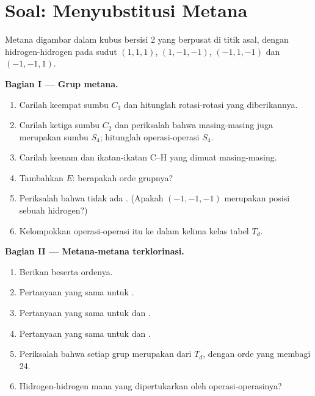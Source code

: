 \section{Soal: Menyubstitusi Metana}

\begin{problem}
\label{pb:b3:point-groups:1}
Metana digambar dalam kubus bersisi 2 yang berpusat di titik asal, dengan
hidrogen-hidrogen pada sudut $(1,1,1)$, $(1,-1,-1)$, $(-1,1,-1)$ dan
$(-1,-1,1)$.

\medskip\noindent\textbf{Bagian I --- Grup metana.}
\begin{enumerate}[beginpenalty=10000]
  \item Carilah keempat sumbu $C_3$ dan hitunglah rotasi-rotasi yang
        diberikannya.
  \item Carilah ketiga sumbu $C_2$ dan periksalah bahwa masing-masing juga
        merupakan sumbu $S_4$; hitunglah operasi-operasi $S_4$.
  \item Carilah keenam  dan ikatan-ikatan C--H yang dimuat
        masing-masing.
  \item Tambahkan $E$: berapakah orde grupnya?
  \item Periksalah bahwa tidak ada . (Apakah $(-1,-1,-1)$
        merupakan posisi sebuah hidrogen?)
  \item Kelompokkan operasi-operasi itu ke dalam kelima kelas tabel $T_d$.
\end{enumerate}

\medskip\noindent\textbf{Bagian II --- Metana-metana terklorinasi.}
\begin{enumerate}[resume, beginpenalty=10000]
  \item Berikan   beserta ordenya.
  \item Pertanyaan yang sama untuk .
  \item Pertanyaan yang sama untuk  dan .
  \item Pertanyaan yang sama untuk  dan .
  \item Periksalah bahwa setiap grup merupakan  dari $T_d$, dengan
        orde yang membagi 24.
  \item Hidrogen-hidrogen  mana yang dipertukarkan oleh
        operasi-operasinya?
\end{enumerate}


\end{problem}
